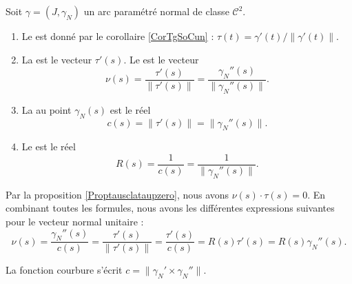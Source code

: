 \begin{definition}      \label{DefCourbureNormleUnit}
    Soit $\gamma=(J,\gamma_N)$ un arc paramétré normal de classe $\mathcal{C}^2$. 
    \begin{enumerate}
        \item
            Le  est donné par le corollaire \ref{CorTgSoCun} : \( \tau(t)=\gamma'(t)/\| \gamma'(t) \|\).
        \item
    La  est le vecteur $\tau'(s)$. Le  est le vecteur
    \begin{equation}
        \nu(s)=\frac{ \tau'(s) }{ \| \tau'(s) \| }=\frac{ \gamma_N''(s) }{ \| \gamma_N''(s) \| }.
    \end{equation}
\item
    La  au point $\gamma_N(s)$ est le réel
    \begin{equation}
        c(s)=\| \tau'(s) \|=\| \gamma_N''(s) \|.
    \end{equation}
\item
    Le  est le réel
    \begin{equation}
        R(s)=\frac{1}{ c(s) }=\frac{1}{ \| \gamma_N''(s) \| }.
    \end{equation}
    \end{enumerate}
\end{definition}

Par la proposition \ref{Proptausclataupzero}, nous avons $\nu(s)\cdot\tau(s)=0$. En combinant toutes les formules, nous avons les différentes expressions suivantes pour le vecteur normal unitaire :
\begin{equation}        \label{Eq0908nufractauRc}
    \nu(s)=\frac{ \gamma_N''(s) }{ c(s) }=\frac{ \tau'(s) }{ \| \tau'(s) \| }=\frac{ \tau'(s) }{ c(s) }=R(s)\tau'(s)=R(s)\gamma_N''(s).
\end{equation}

\begin{proposition}
    La fonction courbure s'écrit $c=\| \gamma_N'\times \gamma_N'' \|$.
\end{proposition}

